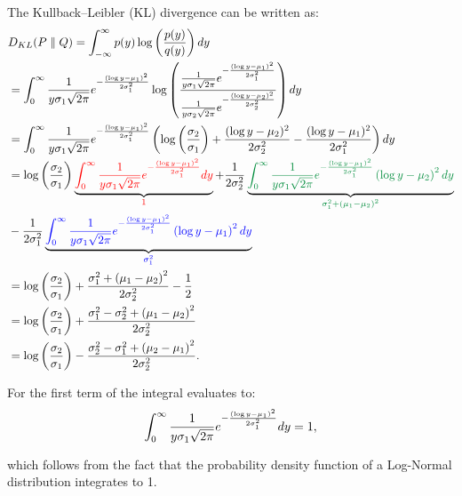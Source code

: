 The Kullback–Leibler (KL) divergence can be written as:
\begin{align}
&D_{KL}(P\parallel Q)=\int_{-\infty}^{\infty}p(y)\log\left(\frac{p(y)}{q(y)}\right)dy \notag\\
&=\int_{0}^{\infty}\frac{1}{y \sigma_1 \sqrt{2\pi}} e^{-\frac{(\log y - \mu_1)^2}{2\sigma_1^2}}\log\left(\frac{\frac{1}{y \sigma_1 \sqrt{2\pi}} e^{-\frac{(\log y - \mu_1)^2}{2\sigma_1^2}}}{\frac{1}{y \sigma_2 \sqrt{2\pi}} e^{-\frac{(\log y - \mu_2)^2}{2\sigma_2^2}}}\right)dy \label{eq:lognormal-KLdivergence} \\
&=\int_{0}^{\infty}\frac{1}{y \sigma_1 \sqrt{2\pi}} e^{-\frac{(\log y - \mu_1)^2}{2\sigma_1^2}}\left(\log\left(\frac{\sigma_2}{\sigma_1}\right)+\frac{(\log y - \mu_2)^2}{2\sigma_2^2}-\frac{(\log y - \mu_1)^2}{2\sigma_1^2}\right)dy \notag \\
&=\log\left(\frac{\sigma_2}{\sigma_1}\right)\underbrace{\textcolor{red}{\int_{0}^{\infty}\frac{1}{y \sigma_1 \sqrt{2\pi}} e^{-\frac{(\log y - \mu_1)^2}{2\sigma_1^2}}dy}}_{\textcolor{red}{1}}+\frac{1}{2\sigma_2^2}\underbrace{\textcolor{PowerPointGreen}{\int_{0}^{\infty}\frac{1}{y \sigma_1 \sqrt{2\pi}} e^{-\frac{(\log y - \mu_1)^2}{2\sigma_1^2}}\left(\log y - \mu_2\right)^2dy}}_{\textcolor{PowerPointGreen}{\sigma_1^2+\left(\mu_1-\mu_2\right)^2}} \notag\\
&-\frac{1}{2\sigma_1^2}\underbrace{\textcolor{blue}{\int_{0}^{\infty}\frac{1}{y \sigma_1 \sqrt{2\pi}} e^{-\frac{(\log y - \mu_1)^2}{2\sigma_1^2}}\left(\log y - \mu_1\right)^2dy}}_{\textcolor{blue}{\sigma_1^2}} \notag\\ 
&=\log \left(\frac{\sigma_2}{\sigma_1}\right)+\frac{\sigma_1^2+\left(\mu_1-\mu_2\right)^2}{2\sigma_2^2}-\frac{1}{2} \notag\\
&=\log \left(\frac{\sigma_2}{\sigma_1}\right)+\frac{\sigma_1^2-\sigma_2^2+\left(\mu_1-\mu_2\right)^2}{2\sigma_2^2} \notag\\
&=\log \left(\frac{\sigma_2}{\sigma_1}\right)-\frac{\sigma_2^2-\sigma_1^2+\left(\mu_2-\mu_1\right)^2}{2\sigma_2^2}. \notag
\end{align}

For the first term of the integral evaluates to:
\begin{equation}\notag
\int_{0}^{\infty}\frac{1}{y \sigma_1 \sqrt{2\pi}} e^{-\frac{(\log y - \mu_1)^2}{2\sigma_1^2}}dy=1,
\end{equation}

which follows from the fact that the probability density function of a Log-Normal distribution integrates to 1. 

